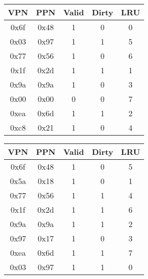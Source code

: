 \documentclass[answers]{exam}
\begin{document}
\begin{minipage}{\textwidth}
 \begin{minipage}[t]{0.45\textwidth}
  \centering
     \makeatletter{}\makeatother
       \begin{tabular}{|c|c|c|c|c|} 
      \hline
        \textbf{VPN} &\textbf{PPN} &\textbf{Valid} &\textbf{Dirty} &\textbf{LRU}\\
         \hline
        0x6f & 0x48 & 1 & 0 & 0\\
         \hline
        0x03 & 0x97 & 1 & 1 & 5\\
         \hline
        0x77 & 0x56 & 1 & 0 & 6\\
         \hline
        0x1f & 0x2d & 1 & 1 & 1\\
         \hline
        0x9a & 0x9a & 1 & 0 & 3\\
         \hline
        0x00 & 0x00 & 0 & 0 & 7\\
         \hline
        0xea & 0x6d & 1 & 1 & 2\\
         \hline
        0xc8 & 0x21 & 1 & 0 & 4\\
         \hline
    \end{tabular}
  \end{minipage}
  \begin{minipage}[t]{0.45\textwidth}
   \centering
        \makeatletter{}\makeatother
         \begin{tabular}{|c|c|c|c|c|} 
      \hline
        \textbf{VPN} &\textbf{PPN} &\textbf{Valid} &\textbf{Dirty} &\textbf{LRU}\\
         \hline
         0x6f & 0x48 & 1 & 0 & 5\\
         \hline
         0x5a & 0x18 & 1 & 0 & 1\\
         \hline
         0x77 & 0x56 & 1 & 1 & 4\\
         \hline
         0x1f & 0x2d & 1 & 1 & 6\\
         \hline
         0x9a & 0x9a & 1 & 1 & 2\\
         \hline
         0x97 & 0x17 & 1 & 0 & 3\\
         \hline
         0xea & 0x6d & 1 & 1 & 7\\
         \hline
         0x03 & 0x97 & 1 & 1 & 0\\
         \hline
    \end{tabular}
   \end{minipage}
\end{minipage}


\newpage
\end{document}
